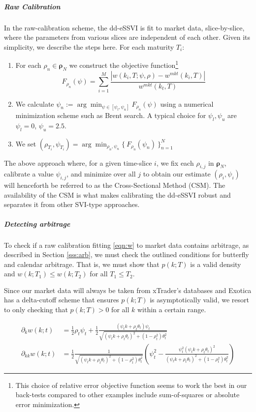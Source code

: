 \documentclass[11pt,letterpaper]{article}
\begin{document}
\subparagraph{Raw Calibration} In the raw-calibration scheme, the dd-eSSVI is fit to market data, slice-by-slice, where the parameters from various slices are independent of each other. Given its simplicity, we describe the steps here. For each maturity $T_i$:
\begin{enumerate}
\item For each $\rho_n \in \pmb{\rho}_N$ we construct the objective function\footnote{This choice of relative error objective function seems to work the best in our back-tests compared to other examples include sum-of-squares or absolute error minimization.} 
\[
F_{\rho_n}(\psi) = \sum_{i=1}^M  \frac{  | w(k_i,T; \psi, \rho ) - w^{mkt}(k_i,T)|  }{ w^{mkt}(k_t,T) }
\]
\item We calculate $ \psi_n :=  \arg\min_{\psi \in [\psi_l,\psi_u]} F_{\rho_n}(\psi) $ using a numerical minimization scheme such as Brent search. A typical choice for $\psi_l, \psi_u$ are $\psi_l = 0$, $\psi_u = 2.5$. \label{item:psiregion} 
\item We set $(\rho_{T_i}, \psi_{T_i}) = \arg\min_{ \rho_n,\psi_n } \{ \  F_{\rho_n}(\psi_n) \  \}_{n=1}^N $
\end{enumerate}

The above approach where, for a given time-slice $i$, we fix each $\rho_{i,j}$ in $\pmb{\rho}_N$, calibrate a value $\psi_{i,j}$, and minimize over all $j$ to obtain our estimate $(\rho_i,\psi_i)$ will henceforth be referred to as the Cross-Sectional Method (CSM). The availability of the CSM is what makes calibrating the dd-eSSVI robust and separates it from other SVI-type approaches. 

\subparagraph{Detecting arbitrage} To check if a raw calibration fitting \ref{eqn:w} to market data contains arbitrage, as described in Section \ref{sss:arb}, we must check the outlined conditions for butterfly and calendar arbitrage. That is, we must show that $p(k;T)$ is a valid density and $w(k;T_1) \leq w(k;T_2)$ for all $T_1 \leq T_2$. 

Since our market data will always be taken from xTrader's databases and Exotica has a delta-cutoff scheme that ensures $p(k;T)$ is asymptotically valid, we resort to only checking that $p(k;T) > 0$ for all $k$ within a certain range. 


\begin{align*}
\partial_k w(k;t) &= \frac{1}{2}\rho_t \psi_t +  \frac{1}{2}\frac{ \left(\psi_t k + \rho_t \theta_t \right)\psi_t  }{ \sqrt{ \left(\psi_t k + \rho_t \theta_t \right)^2 + \left(1-\rho^2_t\right)\theta^2_t  } } \\
\partial_{kk} w(k;t) &= \frac{1}{2}\frac{1}{ \sqrt{ (\psi_t k + \rho_t \theta_t)^2 + (1-\rho_t^2)\theta_t^2 }   } \left(  \psi_t^2 - \frac{ \psi_t^2 (\psi_tk+ \rho_t \theta_t)^2 }{(\psi_t k + \rho_t \theta_t)^2 + (1-\rho_t^2)\theta_t^2  }    \right) 
\end{align*}
\end{document}
